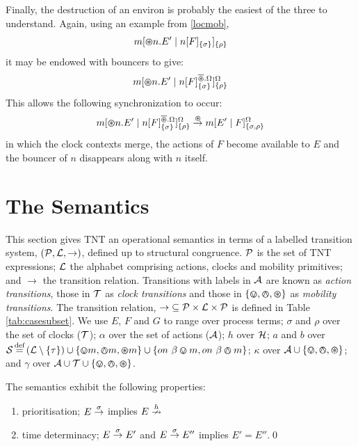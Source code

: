 Finally, the destruction of an environ is probably the easiest of the
three to understand.  Again, using an example from \ref{locmob},
\begin{equation}
{m}[ \varoast n.E^\prime\;|\;{n}[ F ]_{\{\sigma\}} ]_{\{\rho\}}
\end{equation}
it may be endowed with bouncers to give:
\begin{equation}
{m}[ \varoast n.E^\prime \;|\; {n}[ F ]^{\overline{\varoast}.\Omega}_{\{\sigma\}} ]^{\Omega}_{\{\rho\}}
\end{equation}
This allows the following synchronization to occur:
\begin{equation}
{m}[ \varoast n.E^\prime \;|\; {n}[ F ]^{\overline{\varoast}.\Omega}_{\{\sigma\}} ]^{\Omega}_{\{\rho\}}
\stackrel{\varoast}{\rightarrow}
{m}[ E^\prime \;|\; {F} ]^{\Omega}_{\{\sigma, \rho\}}
\end{equation}
in which the clock contexts merge, the actions of $F$ become
available to $E$ and the bouncer of $n$ disappears along with $n$
itself.

\section{The Semantics}
\label{tntsemantics}

This section gives TNT an operational semantics in terms of a labelled
transition system, $(\text{$\mathcal{P}$}, \text{$\mathcal{L}$}, \rightarrow)$, defined
up to structural congruence.  $\text{$\mathcal{P}$}$ is the set of TNT expressions; $\text{$\mathcal{L}$}$ the
alphabet comprising actions, clocks and mobility primitives; and $\rightarrow$ the
transition relation.  Transitions with labels in
$\text{$\mathcal{A}$}$ are known as \emph{action transitions}, those in $\text{$\mathcal{T}$}$ as
\emph{clock transitions} and those in $\text{$\{ \varovee, \varowedge , \varoast\}$}$ as \emph{mobility
transitions}.  The transition relation, $\mathop{\rightarrow} \mathrel{\subseteq}
\text{$\mathcal{P}$} \times \text{$\mathcal{L}$} \times \text{$\mathcal{P}$}$ is defined in Table \ref{tab:casesubset}.
We use $E$, $F$ and $G$ to range over process terms; $\sigma$ and $\rho$ over the
set of clocks ($\text{$\mathcal{T}$}$); $\alpha$ over the set of actions
($\text{$\mathcal{A}$}$); $h$ over $\text{$\mathcal{H}$}$; $a$ and $b$ over 
$\text{$\mathcal{S}$} \operatorname{\stackrel{\textrm{def}}{=}}
\left(\text{$\mathcal{L}$} \setminus \{\tau\}\right) 
\cup 
\{ \varovee m, \varowedge m, \varoast m \} 
\cup
\{ on\ \beta \varovee m, on\ \beta \varowedge m \}
$;
$\kappa$ over $\text{$\mathcal{A}$} \cup \text{$\{ \varovee, \varowedge , \varoast\}$}$;
and $\gamma$ over $\text{$\mathcal{A}$} \cup \text{$\mathcal{T}$} \cup \text{$\{ \varovee, \varowedge , \varoast\}$}$.

\begin{proposition}
The semantics exhibit the following properties:
\begin{enumerate}
\item prioritisation;
$E \stackrel{\sigma}{\rightarrow}$ implies $E \stackrel{h}{\nrightarrow}$ 
\item time determinacy; $E \stackrel{\sigma}{\rightarrow} E'$ and $E
\stackrel{\sigma}{\rightarrow} E''$ implies $E' = E''$.\qed
\end{enumerate}
\end{proposition}


